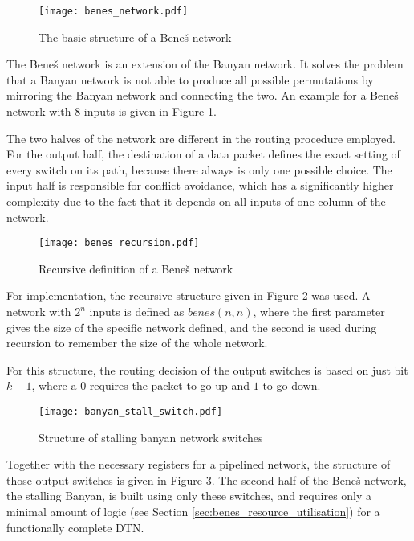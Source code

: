 \begin{figure}[!ht]
	\centering
	\texttt{[image: benes\_network.pdf]}
	\caption{The basic structure of a Beneš network}
	\label{fig:benes}
\end{figure}

The Beneš network is an extension of the Banyan network.
It solves the problem that a Banyan network is not able to produce all possible permutations by mirroring the Banyan network and connecting the two.
An example for a Beneš network with 8 inputs is given in Figure \ref{fig:benes}.

The two halves of the network are different in the routing procedure employed.
For the output half, the destination of a data packet defines the exact setting of every switch on its path, because there always is only one possible choice.
The input half is responsible for conflict avoidance, which has a significantly higher complexity due to the fact that it depends on all inputs of one column of the network.

\begin{figure}[!ht]
	\centering
	\texttt{[image: benes\_recursion.pdf]}
	\caption{Recursive definition of a Beneš network}
	\label{fig:benes_recursion}
\end{figure}

For implementation, the recursive structure given in Figure \ref{fig:benes_recursion} was used.
A network with $2^n$ inputs is defined as $benes(n, n)$, where the first parameter gives the size of the specific network defined, and the second is used during recursion to remember the size of the whole network.

For this structure, the routing decision of the output switches is based on just bit $k - 1$, where a $0$ requires the packet to go up and $1$ to go down.

\begin{figure}[!ht]
	\centering
	\texttt{[image: banyan\_stall\_switch.pdf]}
	\caption{Structure of stalling banyan network switches}
	\label{fig:banyan_stall_switch}
\end{figure}

Together with the necessary registers for a pipelined network, the structure of those output switches is given in Figure \ref{fig:banyan_stall_switch}.
The second half of the Beneš network, the stalling Banyan, is built using only these switches, and requires only a minimal amount of logic (see Section \ref{sec:benes_resource_utilisation}) for a functionally complete DTN.

